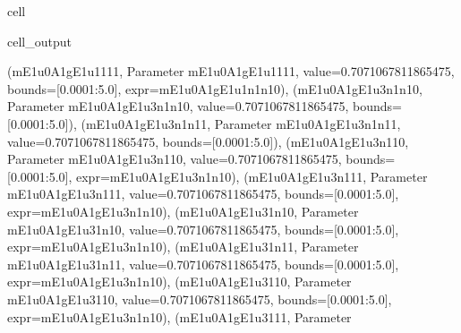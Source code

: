 \documentclass[letterpaper,table,10pt,english]{jupyterBook}
\begin{document}
\begin{sphinxuseclass}{cell}
\begin{sphinxVerbatimOutput}
\begin{sphinxuseclass}{cell_output}
\begin{sphinxVerbatim}[commandchars=\\\{\}]
(\PYGZsq{}m\PYGZus{}E1u\PYGZus{}0\PYGZus{}A1g\PYGZus{}E1u\PYGZus{}1\PYGZus{}1\PYGZus{}1\PYGZus{}1\PYGZsq{}, \PYGZlt{}Parameter \PYGZsq{}m\PYGZus{}E1u\PYGZus{}0\PYGZus{}A1g\PYGZus{}E1u\PYGZus{}1\PYGZus{}1\PYGZus{}1\PYGZus{}1\PYGZsq{}, value=0.7071067811865475, bounds=[0.0001:5.0], expr=\PYGZsq{}m\PYGZus{}E1u\PYGZus{}0\PYGZus{}A1g\PYGZus{}E1u\PYGZus{}1\PYGZus{}n1\PYGZus{}n1\PYGZus{}0\PYGZsq{}\PYGZgt{}), (\PYGZsq{}m\PYGZus{}E1u\PYGZus{}0\PYGZus{}A1g\PYGZus{}E1u\PYGZus{}3\PYGZus{}n1\PYGZus{}n1\PYGZus{}0\PYGZsq{}, \PYGZlt{}Parameter \PYGZsq{}m\PYGZus{}E1u\PYGZus{}0\PYGZus{}A1g\PYGZus{}E1u\PYGZus{}3\PYGZus{}n1\PYGZus{}n1\PYGZus{}0\PYGZsq{}, value=0.7071067811865475, bounds=[0.0001:5.0]\PYGZgt{}), (\PYGZsq{}m\PYGZus{}E1u\PYGZus{}0\PYGZus{}A1g\PYGZus{}E1u\PYGZus{}3\PYGZus{}n1\PYGZus{}n1\PYGZus{}1\PYGZsq{}, \PYGZlt{}Parameter \PYGZsq{}m\PYGZus{}E1u\PYGZus{}0\PYGZus{}A1g\PYGZus{}E1u\PYGZus{}3\PYGZus{}n1\PYGZus{}n1\PYGZus{}1\PYGZsq{}, value=0.7071067811865475, bounds=[0.0001:5.0]\PYGZgt{}), (\PYGZsq{}m\PYGZus{}E1u\PYGZus{}0\PYGZus{}A1g\PYGZus{}E1u\PYGZus{}3\PYGZus{}n1\PYGZus{}1\PYGZus{}0\PYGZsq{}, \PYGZlt{}Parameter \PYGZsq{}m\PYGZus{}E1u\PYGZus{}0\PYGZus{}A1g\PYGZus{}E1u\PYGZus{}3\PYGZus{}n1\PYGZus{}1\PYGZus{}0\PYGZsq{}, value=0.7071067811865475, bounds=[0.0001:5.0], expr=\PYGZsq{}m\PYGZus{}E1u\PYGZus{}0\PYGZus{}A1g\PYGZus{}E1u\PYGZus{}3\PYGZus{}n1\PYGZus{}n1\PYGZus{}0\PYGZsq{}\PYGZgt{}), (\PYGZsq{}m\PYGZus{}E1u\PYGZus{}0\PYGZus{}A1g\PYGZus{}E1u\PYGZus{}3\PYGZus{}n1\PYGZus{}1\PYGZus{}1\PYGZsq{}, \PYGZlt{}Parameter \PYGZsq{}m\PYGZus{}E1u\PYGZus{}0\PYGZus{}A1g\PYGZus{}E1u\PYGZus{}3\PYGZus{}n1\PYGZus{}1\PYGZus{}1\PYGZsq{}, value=0.7071067811865475, bounds=[0.0001:5.0], expr=\PYGZsq{}m\PYGZus{}E1u\PYGZus{}0\PYGZus{}A1g\PYGZus{}E1u\PYGZus{}3\PYGZus{}n1\PYGZus{}n1\PYGZus{}0\PYGZsq{}\PYGZgt{}), (\PYGZsq{}m\PYGZus{}E1u\PYGZus{}0\PYGZus{}A1g\PYGZus{}E1u\PYGZus{}3\PYGZus{}1\PYGZus{}n1\PYGZus{}0\PYGZsq{}, \PYGZlt{}Parameter \PYGZsq{}m\PYGZus{}E1u\PYGZus{}0\PYGZus{}A1g\PYGZus{}E1u\PYGZus{}3\PYGZus{}1\PYGZus{}n1\PYGZus{}0\PYGZsq{}, value=0.7071067811865475, bounds=[0.0001:5.0], expr=\PYGZsq{}m\PYGZus{}E1u\PYGZus{}0\PYGZus{}A1g\PYGZus{}E1u\PYGZus{}3\PYGZus{}n1\PYGZus{}n1\PYGZus{}0\PYGZsq{}\PYGZgt{}), (\PYGZsq{}m\PYGZus{}E1u\PYGZus{}0\PYGZus{}A1g\PYGZus{}E1u\PYGZus{}3\PYGZus{}1\PYGZus{}n1\PYGZus{}1\PYGZsq{}, \PYGZlt{}Parameter \PYGZsq{}m\PYGZus{}E1u\PYGZus{}0\PYGZus{}A1g\PYGZus{}E1u\PYGZus{}3\PYGZus{}1\PYGZus{}n1\PYGZus{}1\PYGZsq{}, value=0.7071067811865475, bounds=[0.0001:5.0], expr=\PYGZsq{}m\PYGZus{}E1u\PYGZus{}0\PYGZus{}A1g\PYGZus{}E1u\PYGZus{}3\PYGZus{}n1\PYGZus{}n1\PYGZus{}0\PYGZsq{}\PYGZgt{}), (\PYGZsq{}m\PYGZus{}E1u\PYGZus{}0\PYGZus{}A1g\PYGZus{}E1u\PYGZus{}3\PYGZus{}1\PYGZus{}1\PYGZus{}0\PYGZsq{}, \PYGZlt{}Parameter \PYGZsq{}m\PYGZus{}E1u\PYGZus{}0\PYGZus{}A1g\PYGZus{}E1u\PYGZus{}3\PYGZus{}1\PYGZus{}1\PYGZus{}0\PYGZsq{}, value=0.7071067811865475, bounds=[0.0001:5.0], expr=\PYGZsq{}m\PYGZus{}E1u\PYGZus{}0\PYGZus{}A1g\PYGZus{}E1u\PYGZus{}3\PYGZus{}n1\PYGZus{}n1\PYGZus{}0\PYGZsq{}\PYGZgt{}), (\PYGZsq{}m\PYGZus{}E1u\PYGZus{}0\PYGZus{}A1g\PYGZus{}E1u\PYGZus{}3\PYGZus{}1\PYGZus{}1\PYGZus{}1\PYGZsq{}, \PYGZlt{}Parameter 
\end{sphinxVerbatim}
\end{sphinxuseclass}
\end{sphinxVerbatimOutput}
\end{sphinxuseclass}
\end{document}
